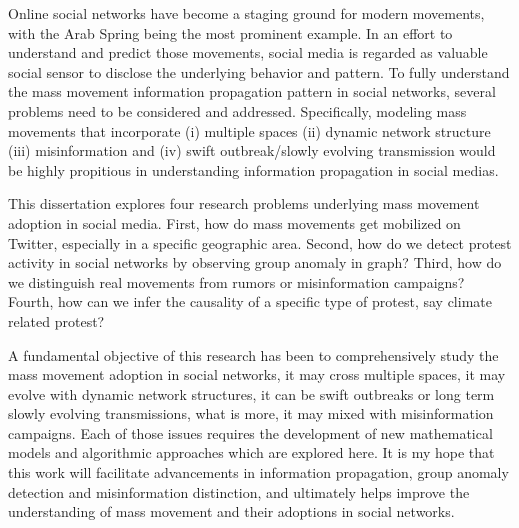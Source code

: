 \documentclass[12pt,dvips]{report}
\begin{document}
Online social networks have become a staging ground for modern movements, with the Arab
Spring being the most prominent example. In an effort to understand and predict those movements, social media is regarded as valuable social sensor to disclose the underlying behavior and pattern. To fully understand the mass movement information propagation pattern in social networks, several problems need to be considered and addressed. Specifically, modeling mass movements that incorporate (i) multiple spaces (ii) dynamic network structure (iii) misinformation and (iv) swift outbreak/slowly evolving transmission would be highly propitious in understanding information propagation in social medias.

This dissertation explores four research problems underlying mass movement adoption in social media. First, how do mass movements get mobilized on Twitter, especially in a specific geographic area. Second, how do we detect protest activity in social networks by observing group anomaly in graph?
Third, how do we distinguish real movements from rumors or misinformation campaigns? Fourth, how can we infer the causality of a specific type of protest, say climate related protest?

A fundamental objective of this research has been to comprehensively study the mass movement adoption in social networks, it may cross multiple spaces, it may evolve with dynamic network structures, it can be swift outbreaks or long term slowly evolving transmissions, what is more, it may mixed with misinformation campaigns. Each of those issues requires the development of new mathematical models and algorithmic approaches which are explored here.  It is my hope that this work will facilitate advancements in information propagation, group anomaly detection and misinformation distinction, and ultimately helps improve the understanding of mass movement and their adoptions in social networks.

\end{document}
